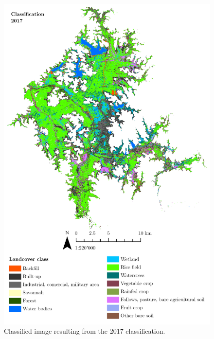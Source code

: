 \documentclass[11pt, A4, oneside]{report}
\begin{document}
\begin{figure}
\includegraphics{figures/3_results/classi2017.png}
\caption{Classified image resulting from the 2017 classification.}
\label{fig:cls17}
\end{figure}
\end{document}
